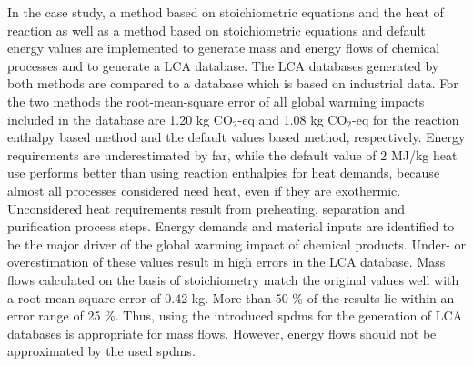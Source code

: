 In the case study, a method based on stoichiometric equations and the heat of reaction as well as a method based on stoichiometric equations and default energy values are implemented to generate mass and energy flows of chemical processes and to generate a LCA database. The LCA databases generated by both methods are compared to a database which is based on industrial data. For the two methods the root-mean-square error of all global warming impacts included in the database are 1.20 kg CO$_2$-eq and 1.08 kg CO$_2$-eq for the reaction enthalpy based method and the default values based method, respectively. Energy requirements are underestimated by far, while the default value of 2 MJ/kg heat use performs better than using reaction enthalpies for heat demands, because almost all processes considered need heat, even if they are exothermic. Unconsidered heat requirements result from preheating, separation and purification process steps. Energy demands and material inputs are identified to be the major driver of the global warming impact of chemical products. Under- or overestimation of these values result in high errors in the LCA database. Mass flows calculated on the basis of stoichiometry match the original values well with a root-mean-square error of 0.42 kg. More than 50 \% of the results lie within an error range of 25 \%. Thus, using the introduced \aclp{spdm} for the generation of LCA databases is appropriate for mass flows. However, energy flows should not be approximated by the used \aclp{spdm}.